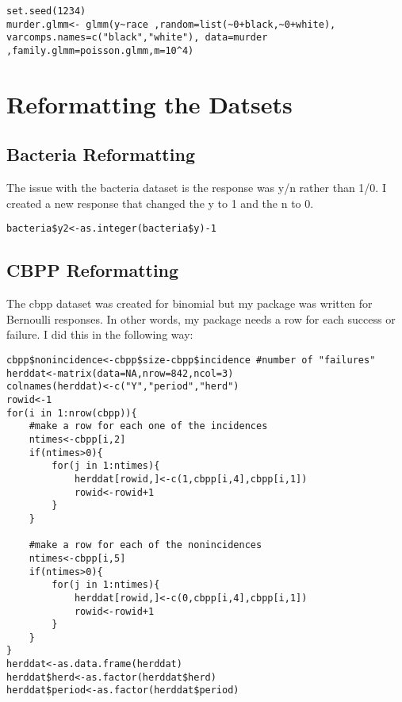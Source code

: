 \documentclass{article}
\begin{document}
\begin{verbatim}
set.seed(1234)
murder.glmm<- glmm(y~race ,random=list(~0+black,~0+white), varcomps.names=c("black","white"), data=murder ,family.glmm=poisson.glmm,m=10^4)
\end{verbatim}







\section{Reformatting the Datsets}
\subsection{Bacteria Reformatting}
The issue with the bacteria dataset is the response was y/n rather than 1/0. I created a new response that changed the y to 1 and the n to 0.

\begin{verbatim}
bacteria$y2<-as.integer(bacteria$y)-1
\end{verbatim}
\subsection{CBPP Reformatting}
The cbpp dataset was created for binomial but my package was written for Bernoulli responses. In other words, my package needs a row for each success or failure. I did this in the following way:
\begin{verbatim}
cbpp$nonincidence<-cbpp$size-cbpp$incidence #number of "failures"
herddat<-matrix(data=NA,nrow=842,ncol=3)
colnames(herddat)<-c("Y","period","herd")
rowid<-1
for(i in 1:nrow(cbpp)){
	#make a row for each one of the incidences 
	ntimes<-cbpp[i,2]
	if(ntimes>0){	
		for(j in 1:ntimes){
			herddat[rowid,]<-c(1,cbpp[i,4],cbpp[i,1])
			rowid<-rowid+1
		}
	}
	
	#make a row for each of the nonincidences
	ntimes<-cbpp[i,5]
	if(ntimes>0){	
		for(j in 1:ntimes){
			herddat[rowid,]<-c(0,cbpp[i,4],cbpp[i,1])
			rowid<-rowid+1
		}
	}
}
herddat<-as.data.frame(herddat)
herddat$herd<-as.factor(herddat$herd)
herddat$period<-as.factor(herddat$period)
\end{verbatim}
\end{document}
